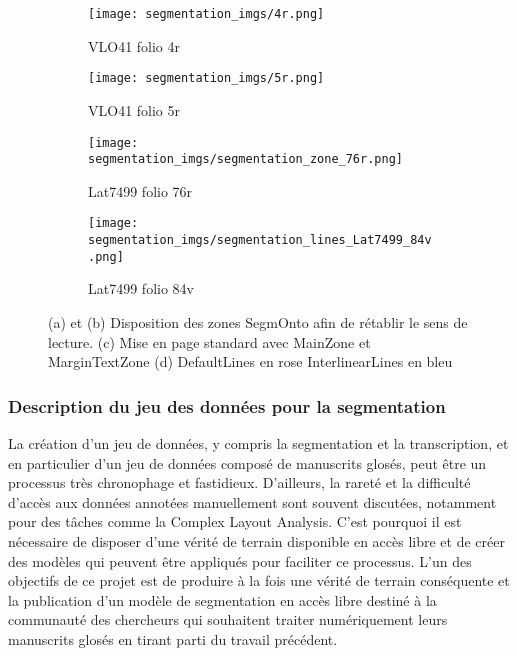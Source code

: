\documentclass[a4paper, twoside, 12pt]{book}
\begin{document}
\begin{figure}[H]
    \begin{subfigure}{0.40\textwidth}
    \centering
    \texttt{[image: segmentation\_imgs/4r.png]}
    \caption{VLO41 folio 4r}
    \end{subfigure}
    \begin{subfigure}{0,40\linewidth}
    \centering
    \texttt{[image: segmentation\_imgs/5r.png]}
    \caption{VLO41 folio 5r}
    \end{subfigure} 
    \begin{subfigure}{0,40\linewidth}
    \centering
\texttt{[image: segmentation\_imgs/segmentation\_zone\_76r.png]}
    \caption{Lat7499 folio 76r }
    \end{subfigure}
     \begin{subfigure}{0,80\linewidth}
    \centering
\texttt{[image: segmentation\_imgs/segmentation\_lines\_Lat7499\_84v.png]}
    \caption{Lat7499 folio 84v }
    \end{subfigure}
    \caption{ (a) et (b) Disposition des zones SegmOnto afin de rétablir le sens de lecture. (c) Mise en page standard avec MainZone et MarginTextZone (d) DefaultLines en rose InterlinearLines en bleu}
\end{figure} 




\subsubsection{Description du jeu des données pour la segmentation}

La création d'un jeu de données, y compris la segmentation et la transcription, et en particulier d'un jeu de données composé de manuscrits glosés, peut être un processus très chronophage et fastidieux. D'ailleurs, la rareté et la difficulté d'accès aux données annotées manuellement sont souvent discutées, notamment pour des tâches comme la Complex Layout Analysis. C'est pourquoi il est nécessaire de disposer d'une vérité de terrain disponible en accès libre et de créer des modèles qui peuvent être appliqués pour faciliter ce processus. L'un des objectifs de ce projet est de produire à la fois une vérité de terrain conséquente et la publication d'un modèle de segmentation en accès libre destiné à la communauté des chercheurs qui souhaitent traiter numériquement leurs manuscrits glosés en tirant parti du travail précédent.\\
\end{document}
